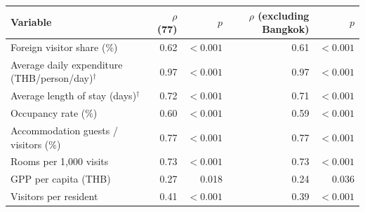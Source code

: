 \begin{tabular}{lrrrr}
\toprule
Variable & $\rho$ (77) & $p$ & $\rho$ (excluding Bangkok) & $p$ \\
\midrule
Foreign visitor share (\%) & 0.62 & $<0.001$ & 0.61 & $<0.001$ \\
Average daily expenditure (THB/person/day)$^\dagger$ & 0.97 & $<0.001$ & 0.97 & $<0.001$ \\
Average length of stay (days)$^\dagger$ & 0.72 & $<0.001$ & 0.71 & $<0.001$ \\
Occupancy rate (\%) & 0.60 & $<0.001$ & 0.59 & $<0.001$ \\
Accommodation guests / visitors (\%) & 0.77 & $<0.001$ & 0.77 & $<0.001$ \\
Rooms per 1,000 visits & 0.73 & $<0.001$ & 0.73 & $<0.001$ \\
GPP per capita (THB) & 0.27 & 0.018 & 0.24 & 0.036 \\
Visitors per resident & 0.41 & $<0.001$ & 0.39 & $<0.001$ \\
\bottomrule
\end{tabular}
